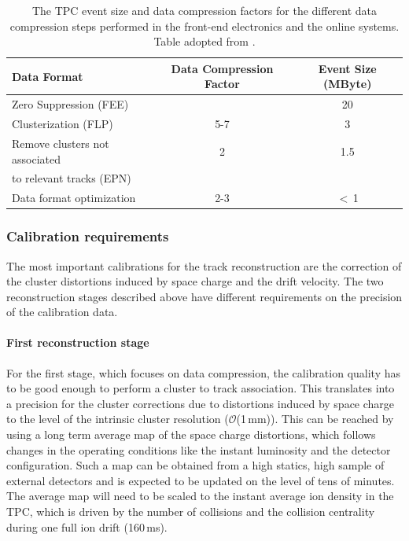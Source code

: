 \begin{table}[hbt]\footnotesize
  \centering
  \begin{tabular}{l  c  c}
    \toprule
    Data Format                     & Data Compression Factor & Event
Size (MByte) \\
    \midrule
    Zero Suppression (FEE)                 &       & 20   \\
    Clusterization (FLP)                   & 5-7   &  3    \\
    Remove clusters not associated         & 2     &  1.5  \\
    to relevant tracks (EPN)               &       &       \\
    Data format optimization               & 2-3   & $<$\,1 \\
    \bottomrule
  \end{tabular}
  \caption[Event size and data compression factors]{The TPC event size
    and data compression factors for the different data compression
    steps performed in the front-end electronics and the online
    systems. Table adopted from \cite{ALICELOI}.}
  \label{tab:reco:compression}
\end{table}


\subsubsection{Calibration requirements}
The most important calibrations for the track reconstruction are the
correction of the cluster distortions induced by space charge and the
drift velocity.
The two reconstruction stages described above have different
requirements on the precision of the calibration data.

\paragraph{First reconstruction stage}
For the first stage, which focuses on data compression, the calibration
quality has to be good enough to perform a cluster to track association.
This translates into a precision for the cluster corrections due to
distortions induced by space charge to the level of the intrinsic
cluster resolution ($\mathcal{O}$(1\,mm)).
This can be reached by using a long term average map of the space
charge distortions, which follows changes in the operating conditions
like the instant luminosity and the detector configuration.
Such a map can be obtained from a high statics, high \pt sample of
external detectors and is expected to be updated on the level of tens
of minutes.
The average map will need to be scaled to the instant average ion
density in the TPC, which is driven by the number of collisions and the
collision centrality during one full ion drift (160\,ms).

